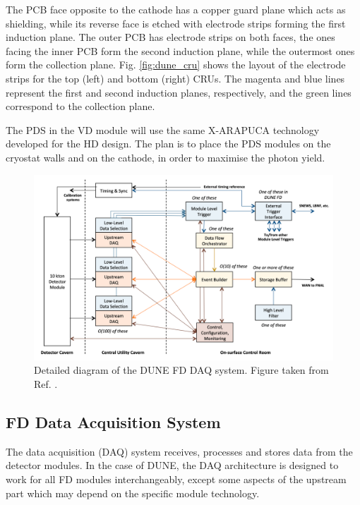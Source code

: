 The PCB face opposite to the cathode has a copper guard plane which acts as shielding, while its reverse face is etched with electrode strips forming the first induction plane. The outer PCB has electrode strips on both faces, the ones facing the inner PCB form the second induction plane, while the outermost ones form the collection plane. Fig. \ref{fig:dune_cru} shows the layout of the electrode strips for the top (left) and bottom (right) CRUs. The magenta and blue lines represent the first and second induction planes, respectively, and the green lines correspond to the collection plane.

The PDS in the VD module will use the same X-ARAPUCA technology developed for the HD design. The plan is to place the PDS modules on the cryostat walls and on the cathode, in order to maximise the photon yield.


\begin{figure}[t]
	\centering
	\includegraphics[width=0.8\linewidth]{Images/DUNE/FD/DAQ_detailed2}
	\caption[Detailed diagram of the DUNE FD DAQ system.]{Detailed diagram of the DUNE FD DAQ system. Figure taken from Ref. \cite{DUNE2020TDR4}.}
	\label{fig:daq1}
\end{figure}

\subsection{FD Data Acquisition System}

The data acquisition (DAQ) system receives, processes and stores data from the detector modules. In the case of DUNE, the DAQ architecture is designed to work for all FD modules interchangeably, except some aspects of the upstream part which may depend on the specific module technology.

